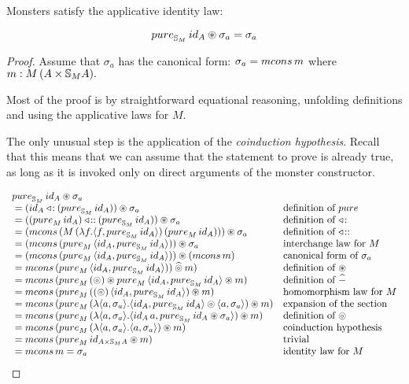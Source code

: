 \begin{lemma}
Monsters satisfy the applicative identity law:

$$
\apure_{\stream{M}}\,\id_A \appl \sigma_a = \sigma_a
$$

\end{lemma}
\begin{proof}
Assume that $\sigma_a$ has the canonical form:
$\sigma_a = \mcons\,m$ where $m:M\,(A\times \mathbb{S}_{M}A).$


Most of the proof is by straightforward equational reasoning, unfolding definitions and using the applicative laws for $M$.

The only unusual step is the application of the {\em coinduction hypothesis}.
Recall that this means that we can assume that the statement to prove is already true, as long as it is invoked only on direct arguments of the monster constructor.

$$
\begin{array}{ll}
\apure_{\stream{M}}\,\id_A \appl \sigma_a \\
{}= (\id_A \acons (\apure_{\stream{M}}\,\id_A)) \appl \sigma_a
  & \mbox{definition of }\apure \\
{}= ((\apure_M\,\id_A) \fcons (\apure_{\stream{M}}\,\id_A)) \appl \sigma_a
  & \mbox{definition of }\acons \\
{}= (\mcons\,(M\,(\lambda f. \langle f, \apure_{\stream{M}}\,\id_A\rangle)\,(\apure_M\,\id_A))) \appl \sigma_a
  & \mbox{definition of }\fcons \\
{}= (\mcons\,(\apure_M\,\langle \id_A, \apure_{\stream{M}}\,\id_A \rangle)) \appl \sigma_a
  & \mbox{interchange law for }M \\
{}= (\mcons\,(\apure_M\,\langle \id_A, \apure_{\stream{M}}\,\id_A\rangle)) \appl (\mcons\,m)
  & \mbox{canonical form of }\sigma_a\\
{}= \mcons\,(\apure_M\,\langle \id_A, \apure_{\stream{M}}\,\id_A\rangle)) \alift{\pappl}  m)
  & \mbox{definition of }\appl \\
{}= \mcons\,(\apure_{M}\,(\pappl) \appl \apure_M\,\langle \id_A, \apure_{\stream{M}}\,\id_A\rangle \appl  m)
  & \mbox{definition of }\alift{-} \\
{}= \mcons\,(\apure_M\,((\pappl)\,\langle \id_A, \apure_{\stream{M}}\,\id_A\rangle) \appl  m)
  & \mbox{homomorphism law for }M\\
{}= \mcons\,(\apure_M\,(\lambda \langle a,\sigma_a\rangle. \langle \id_A, \apure_{\stream{M}}\,\id_A\rangle \pappl \langle a,\sigma_a\rangle) \appl m)
  & \mbox{expansion of the section}\\
{}= \mcons\,(\apure_M\,(\lambda \langle a,\sigma_a\rangle. \langle \id_A\,a, \apure_{\stream{M}}\,\id_A \appl \sigma_a\rangle) \appl m)
  & \mbox{definition of }\pappl\\
{}= \mcons\,(\apure_M\,(\lambda \langle a,\sigma_a\rangle. \langle a, \sigma_a\rangle) \appl m)
  & \mbox{coinduction hypothesis}\\
{}= \mcons\,(\apure_M\,\id_{A\times\stream{M}A} \appl m)
  & \mbox{trivial}\\
{}= \mcons\,m = \sigma_a
  & \mbox{identity law for }M
\end{array}
$$


\end{proof}
